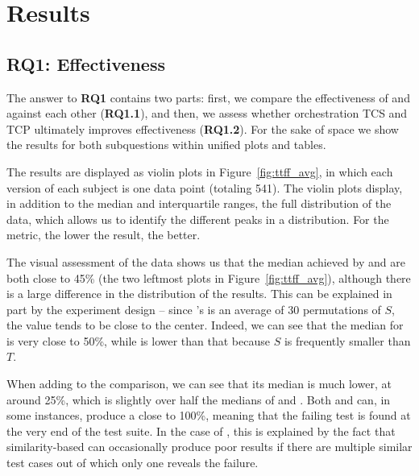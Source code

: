 \section{Results}\label{sec:orch_results}

\subsection{RQ1: Effectiveness}
\label{subsec:rq1}

The answer to \textbf{RQ1} contains two parts: first, we compare the effectiveness of \ek and \fs against each other (\textbf{RQ1.1}), and then, we assess
whether orchestration TCS and TCP ultimately improves effectiveness (\textbf{RQ1.2}). 
For the sake of space we show the results for both subquestions within unified plots and tables.


The \pttff results 
are displayed as violin plots in Figure~\ref{fig:ttff_avg}, in which each version of each subject is one data point (totaling 541).
The violin plots display, in addition to the median and interquartile ranges, the full distribution of the data, 
which allows us to identify the different peaks in a distribution. 
For the \pttff metric, the lower the result, the better.

The visual assessment of the data shows us that the median \pttff achieved by \ek and \fs are both close to 45\% (the two leftmost plots in Figure~\ref{fig:ttff_avg}), although there is a large difference in the distribution of the results.
This can be explained in part by the experiment design -- since \ek's \pttff is an average of 30 permutations of $S$, the value tends to be close to the center.
Indeed, we can see that the median for \rnd is very close to 50\%, while \ek is lower than that because $S$ is frequently smaller than $T$.

When adding \fz to the comparison, we can see that its median \pttff is much lower, at around 25\%, which is slightly over half the medians of \ek and \fs.
Both \fs and \fz can, in some instances, produce a \pttff close to 100\%, meaning that the failing test is found at the very end of the test suite.
In the case of \fs, this is explained by the fact that similarity-based \tcp can occasionally produce poor results if there are multiple similar test cases out of which only one reveals the failure.

